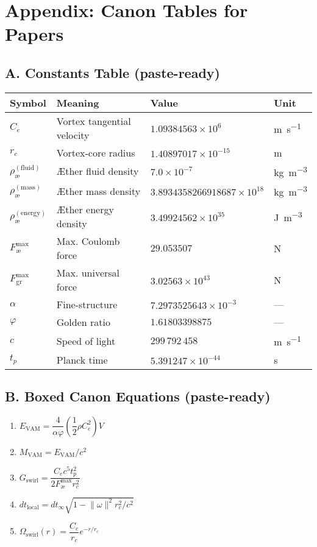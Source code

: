 \documentclass[11pt,a4paper]{article}
\begin{document}
    \section{Appendix: Canon Tables for Papers}
    \subsection*{A. Constants Table (paste-ready)}
    \begin{center}
        \begin{tabular}{@{}llll@{}}
            \toprule
            \textbf{Symbol} & \textbf{Meaning} & \textbf{Value} & \textbf{Unit} \\
            \midrule
            $C_e$ & Vortex tangential velocity & $1.09384563\times 10^{6}$ & \si{m.s^{-1}} \\
            $r_c$ & Vortex-core radius & $1.40897017\times 10^{-15}$ & \si{m} \\
            $\rho_{\text{\ae}}^{(\text{fluid})}$ & Æther fluid density & $7.0\times 10^{-7}$ & \si{kg.m^{-3}} \\
            $\rho_{\text{\ae}}^{(\text{mass})}$ & Æther mass density & $3.8934358266918687\times 10^{18}$ & \si{kg.m^{-3}} \\
            $\rho_{\text{\ae}}^{(\text{energy})}$ & Æther energy density & $3.49924562\times 10^{35}$ & \si{J.m^{-3}} \\
            $F_{\text{\ae}}^{\max}$ & Max. Coulomb force & $29.053507$ & \si{N} \\
            $F_{\text{gr}}^{\max}$ & Max. universal force & $3.02563\times 10^{43}$ & \si{N} \\
            $\alpha$ & Fine-structure & $7.2973525643\times 10^{-3}$ & — \\
            $\varphi$ & Golden ratio & $1.61803398875$ & — \\
            $c$ & Speed of light & $299\,792\,458$ & \si{m.s^{-1}} \\
            $t_p$ & Planck time & $5.391247\times 10^{-44}$ & \si{s} \\
            \bottomrule
        \end{tabular}
    \end{center}

    \subsection*{B. Boxed Canon Equations (paste-ready)}
    \begin{enumerate}
        \item $E_{\text{VAM}}=\dfrac{4}{\alpha\varphi}\left(\dfrac{1}{2}\rho C_e^2\right)V$
        \item $M_{\text{VAM}}=E_{\text{VAM}}/c^2$
        \item $G_{\text{swirl}}=\dfrac{C_e c^5 t_p^2}{2F_{\text{\ae}}^{\max} r_c^2}$
        \item $dt_{\text{local}}=dt_{\infty}\sqrt{1-\lVert\omega\rVert^{2} r_c^{2}/c^2}$ %
        \item $\Omega_{\text{swirl}}(r)=\dfrac{C_e}{r_c}e^{-r/r_c}$
    \end{enumerate}
\end{document}
